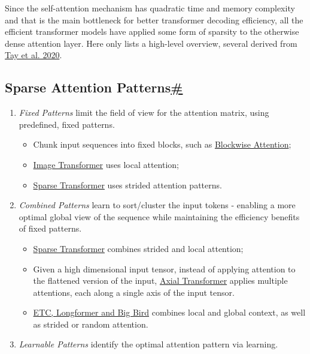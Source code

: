 Since the self-attention mechanism has quadratic time and memory complexity and that is the main bottleneck for better transformer decoding efficiency, all the efficient transformer models have applied some form of sparsity to the otherwise dense attention layer. Here only lists a high-level overview, several derived from \href{https://arxiv.org/abs/2009.06732}{Tay et al. 2020}.

\subsection{\texorpdfstring{Sparse Attention Patterns\hyperref[sparse-attention-patterns]{\#}}{Sparse Attention Patterns\#}}\label{sparse-attention-patterns}

\begin{enumerate}
\item
  \emph{Fixed Patterns} limit the field of view for the attention matrix, using predefined, fixed patterns.

  \begin{itemize}
  \tightlist
  \item
    Chunk input sequences into fixed blocks, such as \href{https://lilianweng.github.io/posts/2023-01-27-the-transformer-family-v2/\#\#strided-context}{Blockwise Attention};
  \item
    \href{https://lilianweng.github.io/posts/2023-01-27-the-transformer-family-v2/\#\#fixed-local-context}{Image Transformer} uses local attention;
  \item
    \href{https://lilianweng.github.io/posts/2023-01-27-the-transformer-family-v2/\#\#strided-context}{Sparse Transformer} uses strided attention patterns.
  \end{itemize}
\item
  \emph{Combined Patterns} learn to sort/cluster the input tokens - enabling a more optimal global view of the sequence while maintaining the efficiency benefits of fixed patterns.

  \begin{itemize}
  \tightlist
  \item
    \href{https://lilianweng.github.io/posts/2023-01-27-the-transformer-family-v2/\#sparse-attention-matrix-factorization-sparse-transformers}{Sparse Transformer} combines strided and local attention;
  \item
    Given a high dimensional input tensor, instead of applying attention to the flattened version of the input, \href{https://arxiv.org/abs/1912.12180}{Axial Transformer} applies multiple attentions, each along a single axis of the input tensor.
  \item
    \href{https://lilianweng.github.io/posts/2023-01-27-the-transformer-family-v2/\#combination-of-local-and-global-context}{ETC, Longformer and Big Bird} combines local and global context, as well as strided or random attention.
  \end{itemize}
\item
  \emph{Learnable Patterns} identify the optimal attention pattern via learning.


\end{enumerate}
